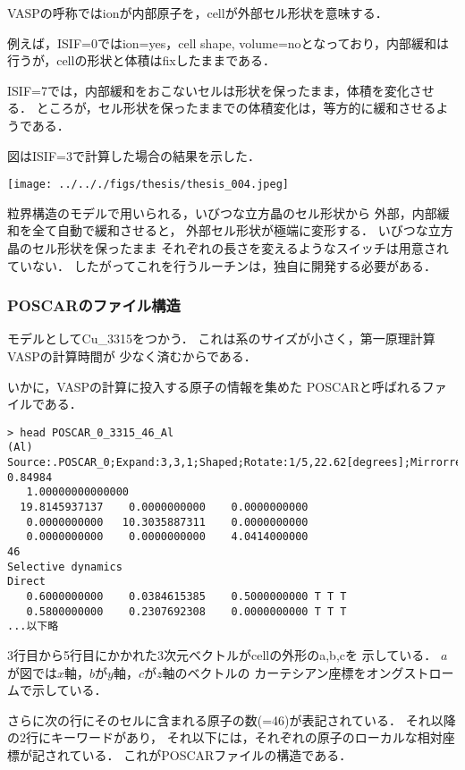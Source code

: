 \documentclass[11pt,dvipdfmx]{jsarticle}
\begin{document}
VASPの呼称ではionが内部原子を，cellが外部セル形状を意味する．

例えば，ISIF=0ではion=yes，cell shape,
volume=noとなっており，内部緩和は行うが，cellの形状と体積はfixしたままである．

ISIF=7では，内部緩和をおこないセルは形状を保ったまま，体積を変化させる．
ところが，セル形状を保ったままでの体積変化は，等方的に緩和させるようである．

図はISIF=3で計算した場合の結果を示した．
\begin{center}
\texttt{[image: ../.././figs/thesis/thesis\_004.jpeg]}
\end{center}


\label{fig:}
粒界構造のモデルで用いられる，いびつな立方晶のセル形状から
外部，内部緩和を全て自動で緩和させると， 外部セル形状が極端に変形する．
いびつな立方晶のセル形状を保ったまま
それぞれの長さを変えるようなスイッチは用意されていない．
したがってこれを行うルーチンは，独自に開発する必要がある．

    \subsubsection{POSCARのファイル構造}\label{poscarux306eux30d5ux30a1ux30a4ux30ebux69cbux9020}

モデルとしてCu\_3315をつかう．
これは系のサイズが小さく，第一原理計算VASPの計算時間が
少なく済むからである．

いかに，VASPの計算に投入する原子の情報を集めた
POSCARと呼ばれるファイルである．

\begin{verbatim}
> head POSCAR_0_3315_46_Al
(Al) Source:.POSCAR_0;Expand:3,3,1;Shaped;Rotate:1/5,22.62[degrees];Mirrorred;Shaped2;Cut:0.81715-0.84984
   1.00000000000000
  19.8145937137    0.0000000000    0.0000000000
   0.0000000000   10.3035887311    0.0000000000
   0.0000000000    0.0000000000    4.0414000000
46
Selective dynamics
Direct
   0.6000000000    0.0384615385    0.5000000000 T T T
   0.5800000000    0.2307692308    0.0000000000 T T T
...以下略
\end{verbatim}

3行目から5行目にかかれた3次元ベクトルがcellの外形のa,b,cを 示している．
\(a\)が図では\(x\)軸，\(b\)が\(y\)軸，\(c\)が\(z\)軸のベクトルの
カーテシアン座標をオングストロームで示している．

さらに次の行にそのセルに含まれる原子の数(=46)が表記されている．
それ以降の2行にキーワードがあり，
それ以下には，それぞれの原子のローカルな相対座標が記されている．
これがPOSCARファイルの構造である．
\end{document}
